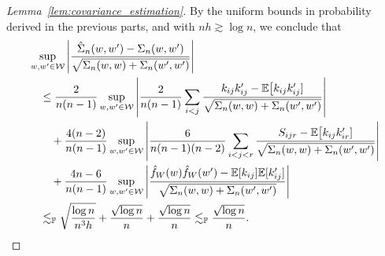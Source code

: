 \begin{proof}[Lemma~\ref{lem:covariance_estimation}]
  By the uniform bounds in probability
  derived in the previous parts,
  and with $n h \gtrsim \log n$,
  we conclude that
  \begin{align*}
    &\sup_{w,w' \in \mathcal{W}}
    \left|
    \frac{\hat \Sigma_n(w,w') - \Sigma_n(w,w')}
    {\sqrt{\Sigma_n(w,w) + \Sigma_n(w',w')}}
    \right| \\
    &\quad\leq
    \frac{2}{n(n-1)}
    \sup_{w,w' \in \mathcal{W}}
    \left|
    \frac{2}{n(n-1)}
    \sum_{i<j}
    \frac{k_{i j} k_{i j}' - \mathbb{E}\big[k_{i j} k_{i j}']}
    {\sqrt{\Sigma_n(w,w) + \Sigma_n(w',w')}}
    \right| \\
    &\qquad+
    \frac{4(n-2)}{n(n-1)}
    \sup_{w,w' \in \mathcal{W}}
    \left|
    \frac{6}{n(n-1)(n-2)}
    \sum_{i<j<r}
    \frac{S_{i j r} - \mathbb{E}\big[k_{i j} k_{i r}']}
    {\sqrt{\Sigma_n(w,w) + \Sigma_n(w',w')}}
    \right| \\
    &\qquad+
    \frac{4n-6}{n(n-1)}
    \sup_{w,w' \in \mathcal{W}}
    \left|
    \frac{\hat f_W(w) \hat f_W(w') - \mathbb{E}[k_{i j}] \mathbb{E}[k_{i j}']}
    {\sqrt{\Sigma_n(w,w) + \Sigma_n(w',w')}}
    \right| \\
    &\quad\lesssim_{\mathbb{P}}
    \sqrt{\frac{\log n}{n^3h}}
    + \frac{\sqrt{\log n}}{n}
    + \frac{\sqrt{\log n}}{n}
    \lesssim_{\mathbb{P}}
    \frac{\sqrt{\log n}}{n}.
  \end{align*}
\end{proof}

